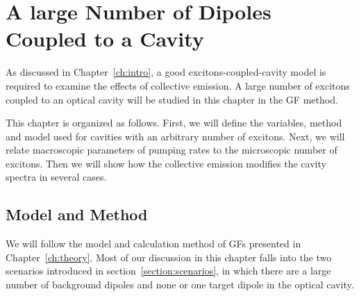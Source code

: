 \chapter[Many-dipole Coupled Cavities]{A large Number of Dipoles Coupled to a Cavity}\label{ch:ensemble}



As discussed in Chapter~\ref{ch:intro}, a good excitons-coupled-cavity model is required to examine the effects of collective emission. A large number of excitons coupled to an optical cavity will be studied in this chapter in the GF method.

This chapter is organized as follows. First, we will define the variables, method and model used for cavities with an arbitrary number of excitons. Next, we will relate macroscopic parameters of pumping rates to the microscopic number of excitons. Then we will show how the collective emission modifies the cavity spectra in several cases.

\section[Model and Method]{Model and Method}\label{Theory}
We will follow the model and calculation method of GFs presented in Chapter~\ref{ch:theory}. Most of our discussion in this chapter falls into the two scenarios introduced in section~\ref{section:scenarios}, in which there are a large number of background dipoles and none or one target dipole in the optical cavity.


